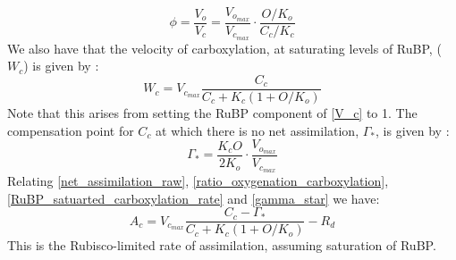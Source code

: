 \documentclass[11pt]{article} %
\begin{document}
\begin{equation} \label{ratio_oxygenation_carboxylation}
\phi = \frac{V_o}{V_c} = \frac{V_{o_{max}}}{V_{c_{max}}}\cdot\frac{O/K_o}{C_c/K_c}
\end{equation}
We also have that the velocity of carboxylation, at saturating levels of RuBP, ($W_c$) is given by \cite{GrantTestsimplebiochemical1989}:
\begin{equation} \label{RuBP_satuarted_carboxylation_rate}
W_c = V_{c_{max}} \frac{C_c}{C_c + K_c (1 + O / K_o)}
\end{equation}
Note that this arises from setting the RuBP component of \eqref{V_c} to 1.
The compensation point for $C_c$ at which there is no net assimilation, $\Gamma_*$, is given by \cite{Farquharbiochemicalmodelphotosynthetic1980}:
\begin{equation} \label{gamma_star}
\Gamma_* = \frac{K_c O}{2 K_o}\cdot \frac{V_{o_{max}}}{V_{c_{max}}}
\end{equation}
Relating \eqref{net_assimilation_raw}, \eqref{ratio_oxygenation_carboxylation}, \eqref{RuBP_satuarted_carboxylation_rate} and \eqref{gamma_star} we have:
\begin{equation} \label{rubisco_limited_photosynthesis}
A_c = V_{c_{max}} \frac{C_c - \Gamma_*}{C_c+K_c(1+O/K_o)}-R_d
\end{equation}
This is the Rubisco-limited rate of assimilation, assuming saturation of RuBP.
\end{document}
